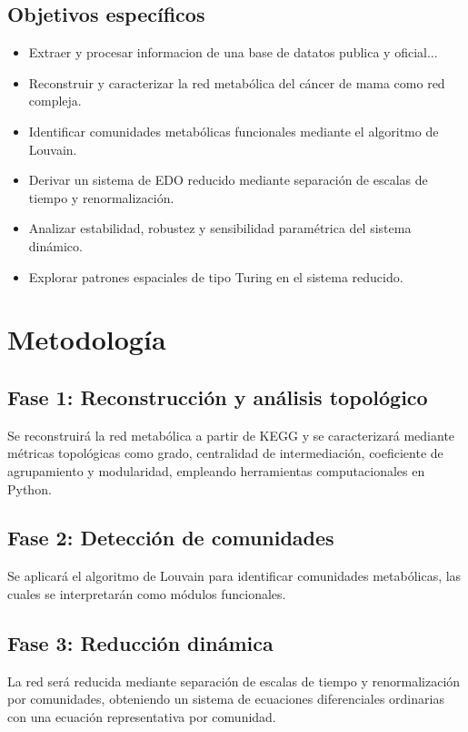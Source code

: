 \documentclass[12pt,spanish]{article}
\begin{document}
	\subsection{Objetivos específicos}
	
	\begin{itemize}
		\item Extraer y procesar informacion de una base de datatos publica y oficial...
		\item Reconstruir y caracterizar la red metabólica del cáncer de mama como red compleja.
		\item Identificar comunidades metabólicas funcionales mediante el algoritmo de Louvain.
		\item Derivar un sistema de EDO reducido mediante separación de escalas de tiempo y renormalización.
		\item Analizar estabilidad, robustez y sensibilidad paramétrica del sistema dinámico.
		\item Explorar patrones espaciales de tipo Turing en el sistema reducido.
	\end{itemize}
	
	\section{Metodología}
	
	\subsection{Fase 1: Reconstrucción y análisis topológico}
	
	Se reconstruirá la red metabólica a partir de KEGG y se caracterizará mediante métricas topológicas como grado, centralidad de intermediación, coeficiente de agrupamiento y modularidad, empleando herramientas computacionales en Python.
	
	\subsection{Fase 2: Detección de comunidades}
	
	Se aplicará el algoritmo de Louvain para identificar comunidades metabólicas, las cuales se interpretarán como módulos funcionales.
	
	\subsection{Fase 3: Reducción dinámica}
	
	La red será reducida mediante separación de escalas de tiempo y renormalización por comunidades, obteniendo un sistema de ecuaciones diferenciales ordinarias con una ecuación representativa por comunidad.
	
\end{document}
